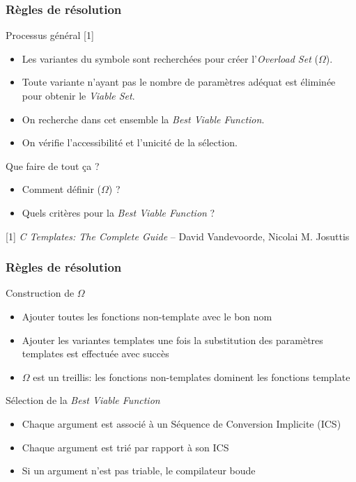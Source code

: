 \documentclass[svgnames]{beamer}
\def\C++{\textup{C}\nolinebreak[4]\hspace{-.05em}\raisebox{.4ex}{\relsize{-3}{\textbf{++}}}}
\begin{document}
\begin{frame}
\frametitle{Règles de résolution}
\begin{block}{Processus général [1]}
\footnotesize
\begin{itemize}
\item Les variantes du symbole sont recherchées pour créer l'\emph{Overload Set} ($\Omega$).
\item Toute variante n'ayant pas le nombre de paramètres adéquat est éliminée pour obtenir le \emph{Viable Set}.
\item On recherche dans cet ensemble la \emph{Best Viable Function}.
\item On vérifie l'accessibilité et l'unicité de la sélection.
\end{itemize}
\end{block}

\begin{block}{Que faire de tout ça ?}
\footnotesize
\begin{itemize}
\item Comment définir ($\Omega$) ?
\item Quels critères pour la \emph{Best Viable Function} ?
\end{itemize}
\end{block}

\tiny{[1] \textit{\C++ Templates: The Complete Guide} -- David Vandevoorde, Nicolai M. Josuttis}

\end{frame}

\begin{frame}
\frametitle{Règles de résolution}
\begin{block}{Construction de $\Omega$}
\begin{itemize}\footnotesize
\item Ajouter toutes les fonctions non-template avec le bon nom
\item Ajouter les variantes templates une fois la substitution des paramètres templates est
effectuée avec succès
\item $\Omega$ est un treillis: les fonctions non-templates dominent les fonctions template
\end{itemize}
\end{block}

\begin{block}{Sélection de la \emph{Best Viable Function}}
\begin{itemize}
\footnotesize
\item Chaque argument est associé à un Séquence de Conversion Implicite (ICS)
\item Chaque argument est trié par rapport à son ICS
\item Si un argument n'est pas triable, le compilateur boude
\end{itemize}
\end{block}

\end{frame}
\end{document}
